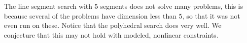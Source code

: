 The line segment search with 5 segments does not solve many problems, this is because several of the problems have dimension less than $5$, so that it was not even run on these.
Notice that the polyhedral search does very well.
We conjecture that this may not hold with modeled, nonlinear constraints.



% 
% 
% 

